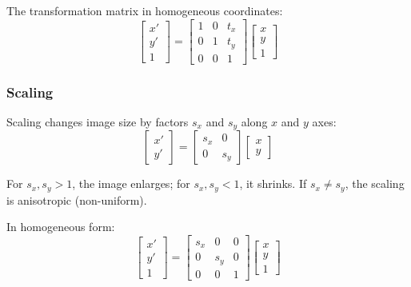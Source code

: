 \documentclass[12pt,a4paper]{AnantDocumentation}
\begin{document}
The transformation matrix in homogeneous coordinates:
\begin{equation}
\begin{bmatrix}
x' \\ y' \\ 1
\end{bmatrix}
=
\begin{bmatrix}
1 & 0 & t_x \\
0 & 1 & t_y \\
0 & 0 & 1
\end{bmatrix}
\begin{bmatrix}
x \\ y \\ 1
\end{bmatrix}
\end{equation}

\subsubsection{Scaling}
Scaling changes image size by factors $s_x$ and $s_y$ along $x$ and $y$ axes:
\begin{equation}
\begin{bmatrix} x' \\ y' \end{bmatrix} =
\begin{bmatrix} s_x & 0 \\ 0 & s_y \end{bmatrix}
\begin{bmatrix} x \\ y \end{bmatrix}
\end{equation}

For $s_x, s_y > 1$, the image enlarges; for $s_x, s_y < 1$, it shrinks.  
If $s_x \ne s_y$, the scaling is anisotropic (non-uniform).

In homogeneous form:
\begin{equation}
\begin{bmatrix}
x' \\ y' \\ 1
\end{bmatrix}
=
\begin{bmatrix}
s_x & 0 & 0 \\
0 & s_y & 0 \\
0 & 0 & 1
\end{bmatrix}
\begin{bmatrix}
x \\ y \\ 1
\end{bmatrix}
\end{equation}
\end{document}
